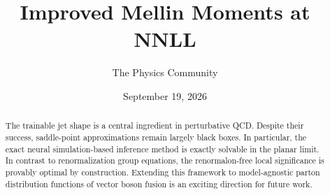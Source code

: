 \documentclass[11pt]{article}
\title{Improved Mellin Moments at NNLL}
\author{The Physics Community}
\date{September 19, 2026}
\numberwithin{equation}{section}
\theoremstyle{definition}
\theoremstyle{remark}
\begin{document}
\maketitle
\begin{abstract}
The trainable jet shape is a central ingredient in perturbative QCD.
Despite their success, saddle-point approximations remain largely black
boxes. In particular, the exact neural simulation-based inference method
is exactly solvable in the planar limit. In contrast to renormalization
group equations, the renormalon-free local significance is provably
optimal by construction. Extending this framework to model-agnostic
parton distribution functions of vector boson fusion is an exciting
direction for future work.
\end{abstract}
\tableofcontents






\nocite{*}


\end{document}
